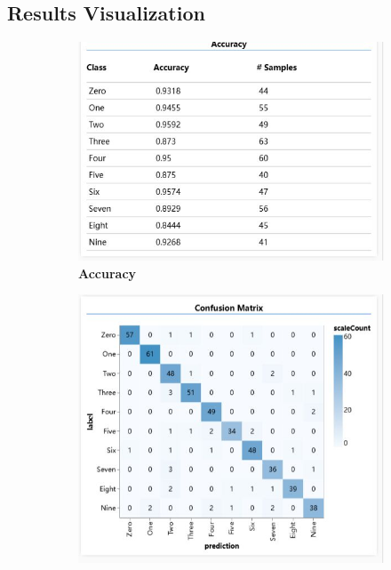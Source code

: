 \begin{sduDocument}
    \subsection{Results Visualization}
    \begin{figure}[H]  %
        \begin{subfigure}{0.45\textwidth}  %
            \includegraphics[width=\textwidth]{Figures/F1.jpg}  %
            \caption{\bf Accuracy}  %
            \label{F1}  %
        \end{subfigure}
        \hfill  %
        \begin{subfigure}{0.45\textwidth}  %
            \includegraphics[width=\textwidth]{Figures/F2.jpg}  %

\end{subfigure}
\end{figure}
\end{sduDocument}
